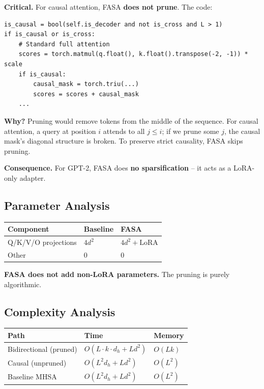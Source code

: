 \textbf{Critical.} For causal attention, FASA \textbf{does not prune}. The code:

\begin{lstlisting}
is_causal = bool(self.is_decoder and not is_cross and L > 1)
if is_causal or is_cross:
    # Standard full attention
    scores = torch.matmul(q.float(), k.float().transpose(-2, -1)) * scale
    if is_causal:
        causal_mask = torch.triu(...)
        scores = scores + causal_mask
    ...
\end{lstlisting}

\textbf{Why?} Pruning would remove tokens from the middle of the sequence. For 
causal attention, a query at position $i$ attends to all $j \leq i$; if we 
prune some $j$, the causal mask's diagonal structure is broken. To preserve 
strict causality, FASA skips pruning.

\textbf{Consequence.} For GPT-2, FASA does \textbf{no sparsification} -- it acts as a 
LoRA-only adapter.

\subsection{Parameter Analysis}

\begin{table}[H]
\centering
\small
\begin{tabular}{lll}
\toprule
\textbf{Component} & \textbf{Baseline} & \textbf{FASA} \\
\midrule
Q/K/V/O projections & $4d^2$ & $4d^2 + \text{LoRA}$ \\
Other & 0 & 0 \\
\bottomrule
\end{tabular}
\end{table}

\textbf{FASA does not add non-LoRA parameters.} The pruning is purely 
algorithmic.

\subsection{Complexity Analysis}

\begin{table}[H]
\centering
\small
\begin{tabular}{lll}
\toprule
\textbf{Path} & \textbf{Time} & \textbf{Memory} \\
\midrule
Bidirectional (pruned) & $O(L \cdot k \cdot d_h + L d^2)$ & $O(L k)$ \\
Causal (unpruned) & $O(L^2 d_h + L d^2)$ & $O(L^2)$ \\
Baseline MHSA & $O(L^2 d_h + L d^2)$ & $O(L^2)$ \\
\bottomrule
\end{tabular}
\end{table}

